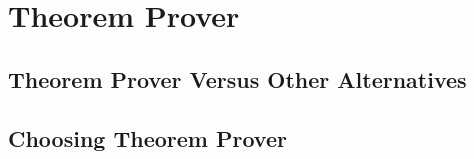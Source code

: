 \section{Theorem Prover}
\subsection{Theorem Prover Versus Other Alternatives}

\subsection{Choosing Theorem Prover}
